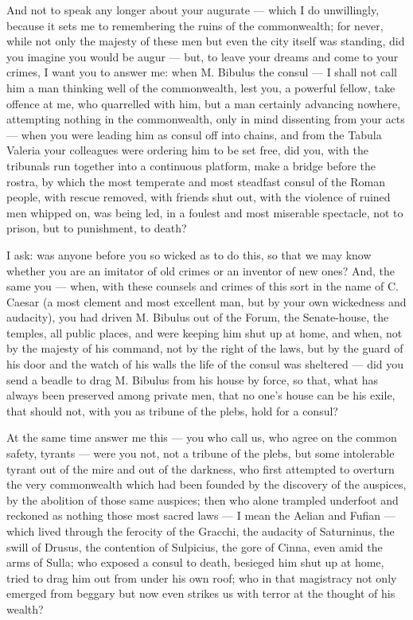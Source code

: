  And not to speak any longer about your augurate --- which I do unwillingly, because it sets me to remembering the ruins of the commonwealth; for never, while not only the majesty of these men but even the city itself was standing, did you imagine you would be augur --- but, to leave your dreams and come to your crimes, I want you to answer me: when M. Bibulus the consul --- I shall not call him a man thinking well of the commonwealth, lest you, a powerful fellow, take offence at me, who quarrelled with him, but a man certainly advancing nowhere, attempting nothing in the commonwealth, only in mind dissenting from your acts --- when you were leading him as consul off into chains, and from the Tabula Valeria your colleagues were ordering him to be set free, did you, with the tribunals run together into a continuous platform, make a bridge before the rostra, by which the most temperate and most steadfast consul of the Roman people, with rescue removed, with friends shut out, with the violence of ruined men whipped on, was being led, in a foulest and most miserable spectacle, not to prison, but to punishment, to death?

 I ask: was anyone before you so wicked as to do this, so that we may know whether you are an imitator of old crimes or an inventor of new ones? And, the same you --- when, with these counsels and crimes of this sort in the name of C. Caesar (a most clement and most excellent man, but by your own wickedness and audacity), you had driven M. Bibulus out of the Forum, the Senate-house, the temples, all public places, and were keeping him shut up at home, and when, not by the majesty of his command, not by the right of the laws, but by the guard of his door and the watch of his walls the life of the consul was sheltered --- did you send a beadle to drag M. Bibulus from his house by force, so that, what has always been preserved among private men, that no one's house can be his exile, that should not, with you as tribune of the plebs, hold for a consul?

 At the same time answer me this --- you who call us, who agree on the common safety, tyrants --- were you not, not a tribune of the plebs, but some intolerable tyrant out of the mire and out of the darkness, who first attempted to overturn the very commonwealth which had been founded by the discovery of the auspices, by the abolition of those same auspices; then who alone trampled underfoot and reckoned as nothing those most sacred laws --- I mean the Aelian and Fufian --- which lived through the ferocity of the Gracchi, the audacity of Saturninus, the swill of Drusus, the contention of Sulpicius, the gore of Cinna, even amid the arms of Sulla; who exposed a consul to death, besieged him shut up at home, tried to drag him out from under his own roof; who in that magistracy not only emerged from beggary but now even strikes us with terror at the thought of his wealth?


